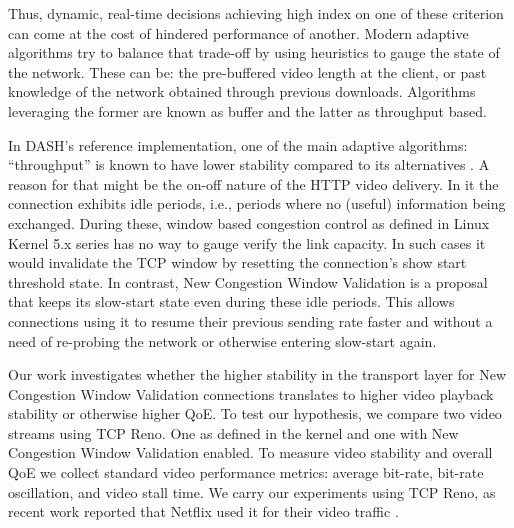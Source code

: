 \documentclass[10pt]{article}
\begin{document}
Thus, dynamic, real-time decisions achieving high index on one of these criterion can come at the cost of hindered performance of another. Modern adaptive algorithms try to balance that trade-off by using heuristics to gauge the state of the network. These can be: the pre-buffered video length at the client, or past knowledge of the network obtained through previous downloads. Algorithms leveraging the former are known as buffer and the latter as throughput based. 

In DASH's reference implementation, one of the main adaptive algorithms: ``throughput'' is known to have lower stability compared to its alternatives \cite{Spiteri-2016-Bola}. A reason for that might be the on-off nature of the HTTP video delivery. In it the connection exhibits idle periods, i.e., periods where no (useful) information being exchanged. During these, window based congestion control as defined in Linux Kernel 5.x series has no way to gauge verify the link capacity. In such cases it would invalidate the TCP window by resetting the connection's show start threshold state. In contrast, New Congestion Window Validation is a proposal that keeps its slow-start state even during these idle periods. This allows connections using it to resume their previous sending rate faster and without a need of re-probing the network or otherwise entering slow-start again.


Our work investigates whether the higher stability in the transport layer for New Congestion Window Validation connections translates to higher video playback stability or otherwise higher QoE. To test our hypothesis, we compare two video streams using TCP Reno. One as defined in the kernel and one with New Congestion Window Validation enabled. To measure video stability and overall QoE we collect standard video performance metrics: average bit-rate, bit-rate oscillation, and video stall time. We carry our experiments using TCP Reno, as recent work reported that Netflix used it for their video traffic \cite{Mishra-2019-the-great-internet-tcp-congestion-control-census}.
\end{document}
